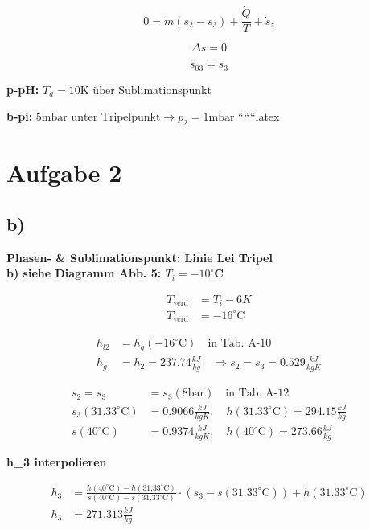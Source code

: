 \[
0 = \dot{m}(s_{2} - s_{3}) + \frac{\dot{Q}}{T} + \dot{s}_{z}
\]

\[
\Delta s = 0
\]

\[
s_{03} = s_{3}
\]

\textbf{p-pH:} $T_{a} = 10 \text{K über Sublimationspunkt}$

\textbf{b-pi:} $5 \text{mbar unter Tripelpunkt} \rightarrow p_{2} = 1 \text{mbar}$
``````latex


\section*{Aufgabe 2}

\subsection*{b)}
\textbf{Phasen- \& Sublimationspunkt: Linie Lei Tripel}\\
\textbf{b) siehe Diagramm Abb. 5: $T_i = -10^\circ$C}

\begin{align*}
T_{\text{verd}} &= T_i - 6K \\
T_{\text{verd}} &= -16^\circ\text{C}
\end{align*}

\begin{align*}
h_{l2} &= h_g(-16^\circ\text{C}) \quad \text{in Tab. A-10} \\
h_g &= h_2 = 237.74 \frac{kJ}{kg} \quad \Rightarrow s_2 = s_3 = 0.529 \frac{kJ}{kgK}
\end{align*}

\begin{align*}
s_2 = s_3 &= s_3 (8 \text{bar}) \quad \text{in Tab. A-12} \\
s_3 (31.33^\circ\text{C}) &= 0.9066 \frac{kJ}{kgK}, \quad h(31.33^\circ\text{C}) = 294.15 \frac{kJ}{kg} \\
s(40^\circ\text{C}) &= 0.9374 \frac{kJ}{kgK}, \quad h(40^\circ\text{C}) = 273.66 \frac{kJ}{kg}
\end{align*}

\textbf{h\_3 interpolieren}

\begin{align*}
h_3 &= \frac{h(40^\circ\text{C}) - h(31.33^\circ\text{C})}{s(40^\circ\text{C}) - s(31.33^\circ\text{C})} \cdot (s_3 - s(31.33^\circ\text{C})) + h(31.33^\circ\text{C}) \\
h_3 &= 271.313 \frac{kJ}{kg}
\end{align*}

